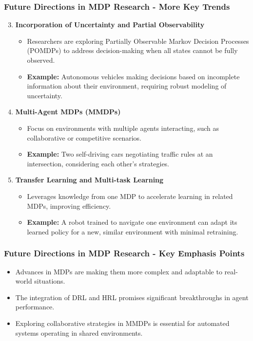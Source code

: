 \documentclass[aspectratio=169]{beamer}
\begin{document}
\begin{frame}[fragile]
    \frametitle{Future Directions in MDP Research - More Key Trends}
    \begin{enumerate}
        \setcounter{enumi}{2}
        \item \textbf{Incorporation of Uncertainty and Partial Observability}  
            \begin{itemize}
                \item Researchers are exploring Partially Observable Markov Decision Processes (POMDPs) to address decision-making when all states cannot be fully observed.
                \item \textbf{Example:} Autonomous vehicles making decisions based on incomplete information about their environment, requiring robust modeling of uncertainty.
            \end{itemize}
        
        \item \textbf{Multi-Agent MDPs (MMDPs)}  
            \begin{itemize}
                \item Focus on environments with multiple agents interacting, such as collaborative or competitive scenarios.
                \item \textbf{Example:} Two self-driving cars negotiating traffic rules at an intersection, considering each other's strategies.
            \end{itemize}
        
        \item \textbf{Transfer Learning and Multi-task Learning}  
            \begin{itemize}
                \item Leverages knowledge from one MDP to accelerate learning in related MDPs, improving efficiency.
                \item \textbf{Example:} A robot trained to navigate one environment can adapt its learned policy for a new, similar environment with minimal retraining.
            \end{itemize}
    \end{enumerate}
\end{frame}

\begin{frame}[fragile]
    \frametitle{Future Directions in MDP Research - Key Emphasis Points}
    \begin{itemize}
        \item Advances in MDPs are making them more complex and adaptable to real-world situations.
        \item The integration of DRL and HRL promises significant breakthroughs in agent performance.
        \item Exploring collaborative strategies in MMDPs is essential for automated systems operating in shared environments.
    \end{itemize}
\end{frame}
\end{document}
